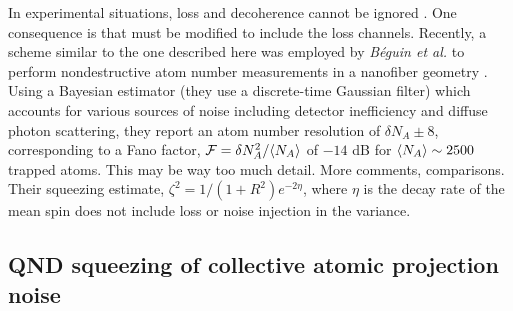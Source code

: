 \documentclass[preprint,aps,pra,onecolumn]{revtex4-1} %
\newcommand{\comment}[1]{{\color{Maroon} #1}}
\begin{document}
In experimental situations, loss and decoherence cannot be ignored \cite{dawkins_dispersive_2011, zhang_collective_2012}. One consequence is that  must be modified to include the loss channels. Recently, a scheme similar to the one described here was employed by \emph{B\'{e}guin et al.} to perform nondestructive atom number measurements in a nanofiber geometry \cite{beguin_generation_2014}.  Using a Bayesian estimator \comment{(they use a discrete-time Gaussian filter)} which accounts for various sources of noise including detector inefficiency and diffuse photon scattering, they report an atom number resolution of $\delta N_A \pm 8$, corresponding to a Fano factor, $\mathcal{F} = \delta N_A^2/\langle{N_A}\rangle$ of $-14$ dB for $\langle{N_A}\rangle\sim2500$ trapped atoms.  \comment{This may be way too much detail.  More comments, comparisons. Their squeezing estimate, $\zeta^2 = 1/(1+R^2)e^{-2\eta}$, where $\eta$ is the decay rate of the mean spin does not include loss or noise injection in the variance.}


	\subsection{QND squeezing of collective atomic projection noise}
\end{document}
